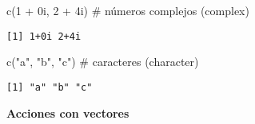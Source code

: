 \documentclass[
  a4paper,
]{article}
\newenvironment{Shaded}{}{}
\newcommand{\CommentTok}[1]{\textcolor[rgb]{0.42,0.45,0.49}{#1}}
\newcommand{\DecValTok}[1]{\textcolor[rgb]{0.00,0.36,0.77}{#1}}
\newcommand{\FunctionTok}[1]{\textcolor[rgb]{0.44,0.26,0.76}{#1}}
\newcommand{\NormalTok}[1]{\textcolor[rgb]{0.14,0.16,0.18}{#1}}
\newcommand{\SpecialCharTok}[1]{\textcolor[rgb]{0.00,0.36,0.77}{#1}}
\newcommand{\StringTok}[1]{\textcolor[rgb]{0.01,0.18,0.38}{#1}}
\begin{document}
\begin{Shaded}
\begin{Highlighting}[]
\FunctionTok{c}\NormalTok{(}\DecValTok{1} \SpecialCharTok{+} \DecValTok{0}\NormalTok{i, }\DecValTok{2} \SpecialCharTok{+} \DecValTok{4}\NormalTok{i) }\CommentTok{\# números complejos (complex)}
\end{Highlighting}
\end{Shaded}

\begin{verbatim}
[1] 1+0i 2+4i
\end{verbatim}

\begin{Shaded}
\begin{Highlighting}[]
\FunctionTok{c}\NormalTok{(}\StringTok{"a"}\NormalTok{, }\StringTok{"b"}\NormalTok{, }\StringTok{"c"}\NormalTok{) }\CommentTok{\# caracteres (character)}
\end{Highlighting}
\end{Shaded}

\begin{verbatim}
[1] "a" "b" "c"
\end{verbatim}

\textbf{Acciones con vectores}
\end{document}
